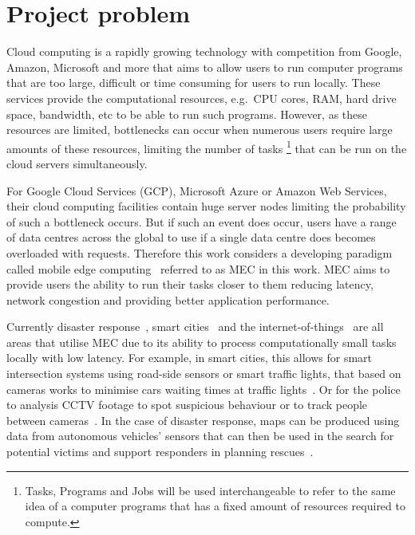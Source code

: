 \chapter{Project problem}\label{ch:project-problem}
Cloud computing is a rapidly growing technology with competition from Google, Amazon, Microsoft and more that aims to
allow users to run computer programs that are too large, difficult or time consuming for users to run locally.
These services provide the computational resources, e.g.\ CPU cores, RAM, hard drive space, bandwidth, etc
to be able to run such programs. However, as these resources are limited, bottlenecks can occur when
numerous users require large amounts of these resources, limiting the number of tasks
\footnote{Tasks, Programs and Jobs will be used interchangeable to refer to the same idea of a computer programs that
has a fixed amount of resources required to compute.} that can be run on the cloud servers simultaneously.

For Google Cloud Services (GCP), Microsoft Azure or Amazon Web Services, their cloud computing facilities contain huge
server nodes limiting the probability of such a bottleneck occurs. But if such an event does occur, users
have a range of data centres across the global to use if a single data centre does becomes overloaded with requests.
Therefore this work considers a developing paradigm~\citep{mobile_edge_survey} called mobile edge
computing~\citep{hu2015mobile} referred to as MEC in this work. MEC aims to provide users the ability to run their
tasks closer to them reducing latency, network congestion and providing better application performance.

Currently disaster response~\citep{mobile_edge_disaster}, smart cities~\citep{smart_disaster_management} and the
internet-of-things~\citep{mobile_edge_IoT} are all areas that utilise MEC due to its ability
to process computationally small tasks locally with low latency. For example, in smart cities, this
allows for smart intersection systems using road-side sensors or smart traffic lights, that based
on cameras works to minimise cars waiting times at traffic lights~\citep{smart_cities_traffic_lights}. Or for the
police to analysis CCTV footage to spot suspicious behaviour or to track people between cameras~\citep{Sreenu2019}.
In the case of disaster response, maps can be produced using data from autonomous vehicles' sensors that can then be
used in the search for potential victims and support responders in planning rescues~\citep{smart_disaster_management}.

